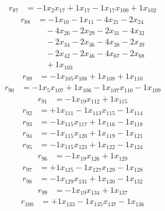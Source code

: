 \[\begin{aligned}
r_{87} &= - 1 x_{2} x_{17} + 1 x_{17} - 1 x_{17} x_{100} + 1 x_{102}
\end{aligned}\]
\[\begin{aligned}
r_{88} &= - 1 x_{10} - 1 x_{11} - 4 x_{21} - 2 x_{24} \\
 &\quad - 4 x_{26} - 2 x_{29} - 2 x_{31} - 4 x_{32} \\
 &\quad - 2 x_{34} - 2 x_{36} - 4 x_{38} - 2 x_{39} \\
 &\quad - 2 x_{42} - 2 x_{46} - 4 x_{67} - 2 x_{68} \\
 &\quad + 1 x_{103}
\end{aligned}\]
\[\begin{aligned}
r_{89} &= - 1 x_{105} x_{108} + 1 x_{108} + 1 x_{110}
\end{aligned}\]
\[\begin{aligned}
r_{90} &= - 1 x_{5} x_{107} + 1 x_{106} - 1 x_{107} x_{110} - 1 x_{109}
\end{aligned}\]
\[\begin{aligned}
r_{91} &= - 1 x_{19} x_{112} + 1 x_{115}
\end{aligned}\]
\[\begin{aligned}
r_{92} &= + 1 x_{111} - 1 x_{113} x_{115} - 1 x_{114}
\end{aligned}\]
\[\begin{aligned}
r_{93} &= - 1 x_{115} x_{117} + 1 x_{116} - 1 x_{118}
\end{aligned}\]
\[\begin{aligned}
r_{94} &= - 1 x_{115} x_{120} + 1 x_{119} - 1 x_{121}
\end{aligned}\]
\[\begin{aligned}
r_{95} &= - 1 x_{115} x_{123} + 1 x_{122} - 1 x_{124}
\end{aligned}\]
\[\begin{aligned}
r_{96} &= - 1 x_{19} x_{126} + 1 x_{129}
\end{aligned}\]
\[\begin{aligned}
r_{97} &= + 1 x_{125} - 1 x_{127} x_{129} - 1 x_{128}
\end{aligned}\]
\[\begin{aligned}
r_{98} &= - 1 x_{129} x_{131} + 1 x_{130} - 1 x_{132}
\end{aligned}\]
\[\begin{aligned}
r_{99} &= - 1 x_{19} x_{134} + 1 x_{137}
\end{aligned}\]
\[\begin{aligned}
r_{100} &= + 1 x_{133} - 1 x_{135} x_{137} - 1 x_{136}
\end{aligned}\]
